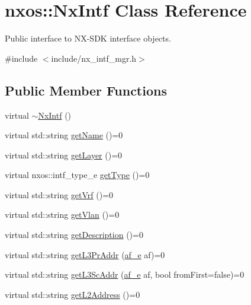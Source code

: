 \hypertarget{classnxos_1_1_nx_intf}{}\section{nxos\+:\+:Nx\+Intf Class Reference}
\label{classnxos_1_1_nx_intf}


Public interface to N\+X-\/\+S\+DK interface objects.  




{\ttfamily \#include $<$include/nx\+\_\+intf\+\_\+mgr.\+h$>$}

\subsection*{Public Member Functions}
\begin{DoxyCompactItemize}
\item 
virtual \mbox{\hyperlink{classnxos_1_1_nx_intf_a10fbaca5467637b238b8a4f1f1aa75e0}{$\sim$\+Nx\+Intf}} ()
\item 
virtual std\+::string \mbox{\hyperlink{classnxos_1_1_nx_intf_a8a0bff66b97d72172f8ed5ce22d8efbd}{get\+Name}} ()=0
\item 
virtual std\+::string \mbox{\hyperlink{classnxos_1_1_nx_intf_af3a8f5ce6dd05fa582d1f7056a4438ca}{get\+Layer}} ()=0
\item 
virtual nxos\+::intf\+\_\+type\+\_\+e \mbox{\hyperlink{classnxos_1_1_nx_intf_aa0885ab26e4abfaa8c7e8e8adb9d32ab}{get\+Type}} ()=0
\item 
virtual std\+::string \mbox{\hyperlink{classnxos_1_1_nx_intf_ae8d21d7a42388aedcda5c7bc3f5c4b04}{get\+Vrf}} ()=0
\item 
virtual std\+::string \mbox{\hyperlink{classnxos_1_1_nx_intf_a3f7942d5ae1a998904d9ea97b252eb21}{get\+Vlan}} ()=0
\item 
virtual std\+::string \mbox{\hyperlink{classnxos_1_1_nx_intf_ae18aa83b5f9984c6b133a8d447aa5430}{get\+Description}} ()=0
\item 
virtual std\+::string \mbox{\hyperlink{classnxos_1_1_nx_intf_ace33155a23a777c0f6e5f978d44af0e6}{get\+L3\+Pr\+Addr}} (\mbox{\hyperlink{nx__common_8h_a3a667f48b94db10aa398940dc5bf72d7}{af\+\_\+e}} af)=0
\item 
virtual std\+::string \mbox{\hyperlink{classnxos_1_1_nx_intf_af0aebadac66f6b4fbe8ddbd567a577b6}{get\+L3\+Sc\+Addr}} (\mbox{\hyperlink{nx__common_8h_a3a667f48b94db10aa398940dc5bf72d7}{af\+\_\+e}} af, bool from\+First=false)=0
\item 
virtual std\+::string \mbox{\hyperlink{classnxos_1_1_nx_intf_a8a7f92f0c28178165fd0448c33ff681b}{get\+L2\+Address}} ()=0

\end{DoxyCompactItemize}
